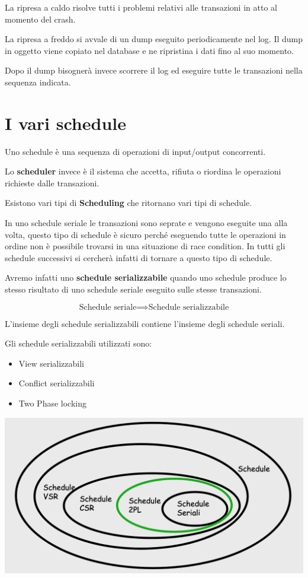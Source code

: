 La ripresa a caldo risolve tutti i problemi relativi alle transazioni in atto al momento del crash.

La ripresa a freddo si avvale di un dump eseguito periodicamente nel log. Il dump in oggetto viene copiato nel database e ne ripristina i dati fino al suo momento.

Dopo il dump bisognerà invece scorrere il log ed eseguire tutte le transazioni nella sequenza indicata.

\section{I vari schedule}

Uno schedule è una sequenza di operazioni di input/output concorrenti.

Lo \textbf{scheduler} invece è il sistema che accetta, rifiuta o riordina le operazioni richieste dalle transazioni.

Esistono vari tipi di \textbf{Scheduling} che ritornano vari tipi di schedule.

In uno schedule seriale le transazioni sono seprate e vengono eseguite una alla volta, questo tipo di schedule è sicuro perché eseguendo tutte le operazioni in ordine non è possibile trovarsi in una situazione di race condition. In tutti gli schedule successivi si cercherà infatti di tornare a questo tipo di schedule.

Avremo infatti uno \textbf{schedule serializzabile} quando uno schedule produce lo stesso risultato di uno schedule seriale eseguito sulle stesse transazioni.

\[ \text{Schedule seriale} \implies \text{Schedule serializzabile}\]

L'insieme degli schedule serializzabili contiene l'insieme degli schedule seriali.

Gli schedule serializzabili utilizzati sono:
\begin{itemize}
    \item View serializzabili
    \item Conflict serializzabili
    \item Two Phase locking
\end{itemize}

\includegraphics[width=\linewidth]{img/schedules.png}

